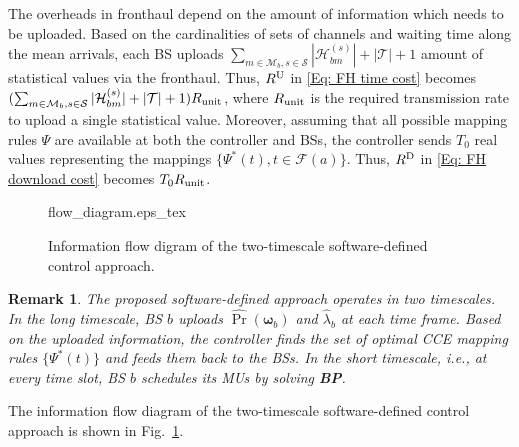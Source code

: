 \documentclass[conference]{IEEEtran}
\newtheorem{remark}{Remark}
\begin{document}
The overheads in fronthaul depend on the amount of information which needs to be uploaded.
Based on the cardinalities of sets of channels and waiting time along the mean arrivals, each BS uploads $\sum_{m\in\mathcal{M}_b,s\in\mathcal{S}}|\mathcal{H}_{bm}^{(s)}|+|\mathcal{T}|+1$ amount of statistical values via the fronthaul.
%
Thus, $R^{\rm U}$ in \eqref{Eq: FH time cost} becomes  $(\sum_{m\in\mathcal{M}_b,s\in\mathcal{S}}|\mathcal{H}_{bm}^{(s)}|+|\mathcal{T}|+1)R_{\rm unit}$, where $R_{\rm unit}$ is the required transmission rate to upload a single statistical value.
%
%
Moreover, assuming that all possible mapping rules $\Psi$ are available at both the controller and BSs, the controller  sends $T_0$ real values representing the mappings $\{\Psi^{*}(t),t\in\mathcal{F}(a)\}$. Thus, $R^{\rm D}$ in \eqref{Eq: FH download cost} becomes $T_0R_{\rm unit}$.
%
%
%
%
\begin{figure}[!t]
\vspace{1em}
\centering
	{\def\svgwidth{\columnwidth}
		{flow_diagram.eps_tex}}
			\vspace{-2em}
	\caption{Information flow digram of the two-timescale software-defined control approach.}
	\label{Fig: Flow diagram} 	
	\vspace{-2em}
\end{figure}
%
%
\begin{remark}
The proposed  software-defined approach operates in two timescales. In the long timescale,  BS $b$ uploads $\hat{\Pr}(\boldsymbol{\omega}_b)$ and $\hat{\lambda}_b$ at each time frame. Based on the uploaded information, the controller finds the set of optimal CCE mapping rules $\{\Psi^{*}(t)\}$ and feeds them back to the BSs. In the short timescale, i.e., at every time slot, BS $b$ schedules its MUs by solving {\bf BP}.
\end{remark}
The information flow diagram of the  two-timescale software-defined control approach is shown in Fig.~\ref{Fig: Flow diagram}.
%
%
%

%
%
%
%
\end{document}
